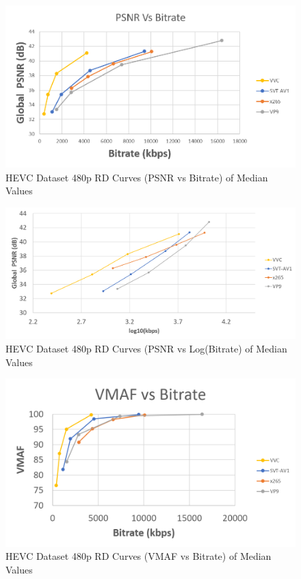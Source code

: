 \documentclass{book}
\begin{document}
\begin{figure}[hbt!]
	\centering
	\includegraphics[width=1.0\linewidth]{pictures/ch7/HEVC-480p_BD-PSNR.png}
	\caption{HEVC Dataset 480p RD Curves (PSNR vs Bitrate) of Median Values}
\label{fig:HEVC-480p-PSNR}
\end{figure}


\begin{figure}[hbt!]
	\centering
	\includegraphics[width=\linewidth]{pictures/ch7/HEVC-480p_logPSNR.png}
	\caption{HEVC Dataset 480p RD Curves (PSNR vs Log(Bitrate) of Median Values}
	\label{fig:HEVC-480p-logPSNR}
\end{figure}


\begin{figure}[hbt!]
	\centering
	\includegraphics[width=1.0\linewidth]{pictures/ch7/HEVC-480p_BD-VMAF.png}
	\caption{HEVC Dataset 480p RD Curves (VMAF vs Bitrate) of Median Values}
\label{fig:HEVC-480p-VMAF}
\end{figure}
\end{document}
